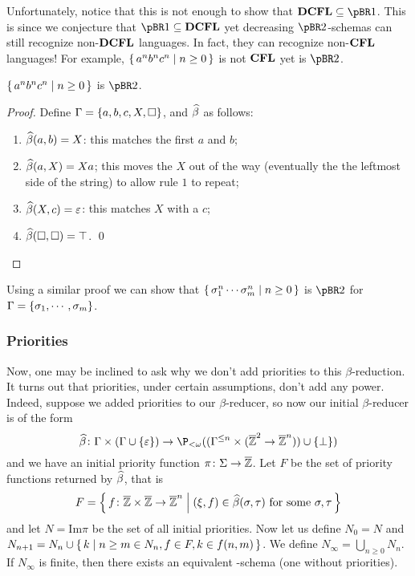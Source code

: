 \documentclass{llncs}
\begin{document}
Unfortunately, notice that this is not enough to show that $\DCFL\subseteq\pBR1$.
This is since we conjecture that $\pBR1\subseteq\DCFL$ yet decreasing $\pBR2$-schemas can still recognize non-$\hbox{{\bf DCFL}}$ languages.
In fact, they can recognize non-$\hbox{{\bf CFL}}$ languages!
For example, $\set{a^nb^nc^n}[n\geq0]$ is not $\hbox{{\bf CFL}}$ yet is $\pBR2$.

\begin{proposition}

    $\set{a^nb^nc^n}[n\geq0]$ is $\pBR2$.

\end{proposition}

\begin{proof}

    Define $\Gamma=\set{a,b,c,X,\square}$, and $\widehat\beta$ as follows:
    \begin{enumerate}
        \item $\widehat\beta(a,b)=X$: this matches the first $a$ and $b$;
        \item $\widehat\beta(a,X)=Xa$; this moves the $X$ out of the way (eventually the the leftmost side of the string) to allow
            rule $1$ to repeat;
        \item $\widehat\beta(X,c)=\varepsilon$: this matches $X$ with a $c$;
        \item $\widehat\beta(\square,\square)=\top$.
    \qed
    \end{enumerate}

\end{proof}

Using a similar proof we can show that $\set{\sigma_1^n\cdots\sigma_m^n}[n\geq0]$ is $\pBR2$ for
$\Gamma=\set{\sigma_1,\cdots,\sigma_m}$.

\subsubsection{Priorities}

Now, one may be inclined to ask why we don't add priorities to this $\beta$-reduction.
It turns out that priorities, under certain assumptions, don't add any power.
Indeed, suppose we added priorities to our $\beta$-reducer, so now our initial $\beta$-reducer is of the form
$$ \hb\colon\Gamma\times(\Gamma\cup\set\epsilon)\to\P_{<\omega}((\Gamma^{\leq n}\times(\bbZ^2\to\bbZ^n))\cup\set\bot) $$
and we have an initial priority function $\pi\colon\Sigma\to\overline{\mathbb Z}$.
Let $F$ be the set of priority functions returned by $\widehat\beta$, that is
$$ F = \set{f\colon\bbZ\times\bbZ\to\bbZ^n}[(\xi,f)\in\hb(\sigma,\tau)\hbox{ for some $\sigma,\tau$}] $$
and let $N=\mathrm{Im}\pi$ be the set of all initial priorities.
Now let us define $N_0=N$ and $N_{n+1} = N_n\cup\set{k}[n\geq m\in N_n, f\in F,k\in f(n,m)]$.
We define $N_\infty=\bigcup_{n\geq0}N_n$.
If $N_\infty$ is finite, then there exists an equivalent \BR-schema (one without priorities).
\end{document}
